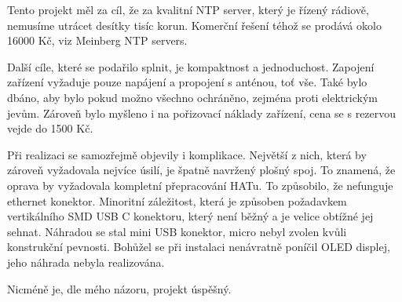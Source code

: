 Tento projekt měl za cíl, že za kvalitní NTP server, který je řízený rádiově, nemusíme
utrácet desítky tisíc korun. Komerční řešení téhož se prodává okolo 16000 Kč, viz Meinberg
NTP servers.

Další cíle, které se podařilo splnit, je kompaktnost a jednoduchost. Zapojení zařízení
vyžaduje pouze napájení a propojení s anténou, toť vše. Také bylo dbáno, aby bylo pokud
možno všechno ochráněno, zejména proti elektrickým jevům. Zároveň bylo myšleno i na
pořizovací náklady zařízení, cena se s rezervou vejde do 1500 Kč.

Při realizaci se samozřejmě objevily i komplikace. Největší z nich, která by zároveň
vyžadovala nejvíce úsilí, je špatně navržený plošný spoj. To znamená, že oprava by
vyžadovala kompletní přepracování HATu. To způsobilo, že nefunguje ethernet konektor.
Minoritní záležitost, která je způsoben požadavkem vertikálního SMD USB C konektoru, který
není běžný a je velice obtížné jej sehnat. Náhradou se stal mini USB konektor, micro nebyl
zvolen kvůli konstrukční pevnosti. Bohůžel se při instalaci nenávratně poníčil OLED
displej, jeho náhrada nebyla realizována.

Nicméně je, dle mého názoru, projekt úspěšný.
